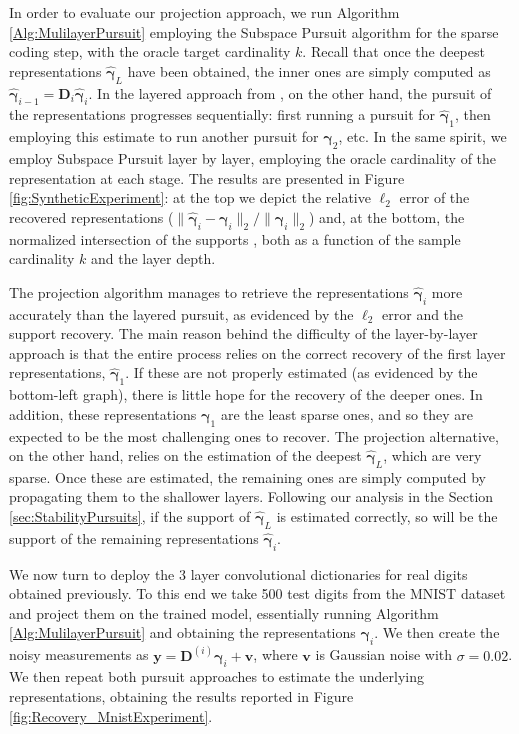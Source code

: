 \documentclass[10pt,journal]{IEEEtran}
\def\v{{\mathbf v}}
\def\y{{\mathbf y}}
\def\D{{\mathbf D}}
\def\gama{{\boldsymbol \gamma}}
\theoremstyle{plain}
\theoremstyle{definition}
\begin{document}
In order to evaluate our projection approach, we run Algorithm \ref{Alg:MulilayerPursuit} employing the Subspace Pursuit algorithm \cite{dai2009subspace} for the sparse coding step, with the oracle target cardinality $k$. Recall that once the deepest representations $\hat{\gama}_L$ have been obtained, the inner ones are simply computed as $\hat{\gama}_{i-1} = \D_i\hat{\gama}_i$. In the layered approach from \cite{Papyan2016convolutional}, on the other hand, the pursuit of the representations progresses sequentially: first running a pursuit for $\hat{\gama}_1$, then employing this estimate to run another pursuit for $\hat{\gama}_2$, etc. In the same spirit, we employ Subspace Pursuit layer by layer, employing the oracle cardinality of the representation at each stage. The results are presented in Figure \ref{fig:SyntheticExperiment}: at the top we depict the relative $\ell_2$ error of the recovered representations ($\|\hat{\gama}_i- {\gama}_i\|_2 / \| {\gama}_i\|_2$) and, at the bottom, the normalized intersection of the supports \cite{Elad_Book}, both as a function of the sample cardinality $k$ and the layer depth. 

The projection algorithm manages to retrieve the representations $\hat{\gama}_i$ more accurately than the layered pursuit, as evidenced by the $\ell_2$ error and the support recovery. The main reason behind the difficulty of the layer-by-layer approach is that the entire process relies on the correct recovery of the first layer representations, $\hat{\gama}_1$. If these are not properly estimated (as evidenced by the bottom-left graph), there is little hope for the recovery of the deeper ones. In addition, these representations $\gama_1$ are the least sparse ones, and so they are expected to be the most challenging ones to recover. The projection alternative, on the other hand, relies on the estimation of the deepest $\hat{\gama}_L$, which are very sparse. Once these are estimated, the remaining ones are simply computed by propagating them to the shallower layers. Following our analysis in the Section \ref{sec:StabilityPursuits}, if the support of $\hat{\gama}_L$ is estimated correctly, so will be the support of the remaining representations $\hat{\gama}_i$.

We now turn to deploy the 3 layer convolutional dictionaries for real digits obtained previously. To this end we take 500 test digits from the MNIST dataset and project them on the trained model, essentially running Algorithm \ref{Alg:MulilayerPursuit} and obtaining the representations $\gama_i$. We then create the noisy measurements as $\y = \D^{(i)}\gama_i + \v$, where $\v$ is Gaussian noise with $\sigma = 0.02$. We then repeat both pursuit approaches to estimate the underlying representations, obtaining the results reported in Figure \ref{fig:Recovery_MnistExperiment}. 
\end{document}
